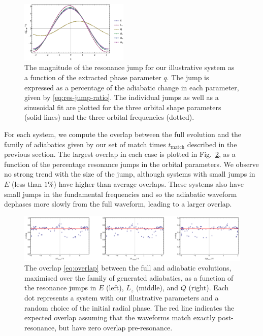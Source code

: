 \documentclass[aps,prd,amsfonts,amssymb,amsmath,nofootinbib,reprint,showpacs]{revtex4}
\newcommand{\figref}[1]{Fig.\ \ref{fig:#1}}
\begin{document}
\begin{figure}[htbp]
\centering
\includegraphics[width=0.46\textwidth]{Fig_jump_vs_q}
\caption{\label{fig:resjump-vs-q}The magnitude of the resonance jump for our illustrative system as a function of the extracted phase parameter $q$. The jump is expressed as a percentage of the adiabatic change in each parameter, given by \eqref{eq:res-jump-ratio}. The individual jumps as well as a sinusoidal fit are plotted for the three orbital shape parameters (solid lines) and the three orbital frequencies (dotted).}
\end{figure}

For each system, we compute the overlap between the full evolution and the family of adiabatics given by our set of match times $t_\mathrm{match}$ described in the previous section. The largest overlap in each case is plotted in \figref{overlap-vs-resjump-ill}, as a function of the percentage resonance jumps in the orbital parameters. We observe no strong trend with the size of the jump, although systems with small jumps in $E$ (less than $1\%$) have higher than average overlaps. These systems also have small jumps in the fundamental frequencies and so the adiabatic waveform dephases more slowly from the full waveform, leading to a larger overlap.

\begin{figure}[htbp]
\centering
\includegraphics[width=\textwidth]{Fig_overlap_vs_resjump_ill}
\caption{\label{fig:overlap-vs-resjump-ill}The overlap \eqref{eq:overlap} between the full and adiabatic evolutions, maximised over the family of generated adiabatics, as a function of the resonance jumps in $E$ (left), $L_z$ (middle), and $Q$ (right). Each dot represents a system with our illustrative parameters and a random choice of the initial radial phase. The red line indicates the expected overlap assuming that the waveforms match exactly post-resonance, but have zero overlap pre-resonance.}
\end{figure}
\end{document}
